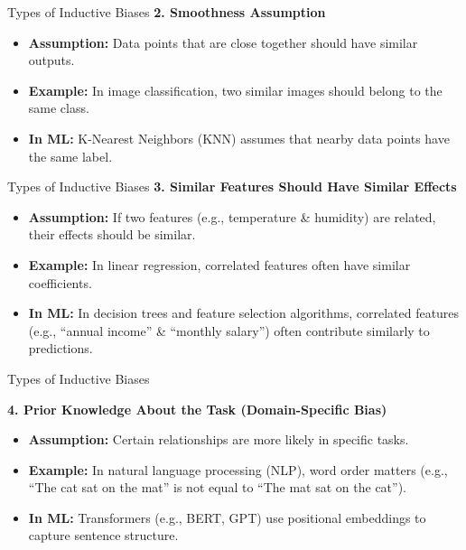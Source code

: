 \documentclass{beamer}
\begin{document}
\begin{frame}{Types of Inductive Biases}
    \textbf{2. Smoothness Assumption}
    \begin{itemize}
        \item \textbf{Assumption:} Data points that are close together should have similar outputs.
        \item \textbf{Example:} In image classification, two similar images should belong to the same class.
        \item \textbf{In ML:} K-Nearest Neighbors (KNN) assumes that nearby data points have the same label.
    \end{itemize}
\end{frame} 

\begin{frame}{Types of Inductive Biases}
    \textbf{3. Similar Features Should Have Similar Effects}
    \begin{itemize}
        \item \textbf{Assumption:} If two features (e.g., temperature \& humidity) are related, their effects should be similar.
        \item \textbf{Example:} In linear regression, correlated features often have similar coefficients.
        \item \textbf{In ML:}  In decision trees and feature selection algorithms, correlated features (e.g., “annual income” \& “monthly salary”) often contribute similarly to predictions.
    \end{itemize}

\end{frame} 

\begin{frame}{Types of Inductive Biases}

    \textbf{4. Prior Knowledge About the Task (Domain-Specific Bias)}
    \begin{itemize}
        \item \textbf{Assumption:} Certain relationships are more likely in specific tasks.
        \item \textbf{Example:} In natural language processing (NLP), word order matters (e.g., “The cat sat on the mat” is not equal to “The mat sat on the cat”).
        \item \textbf{In ML:} Transformers (e.g., BERT, GPT) use positional embeddings to capture sentence structure.
    \end{itemize}
\end{frame}
\end{document}
